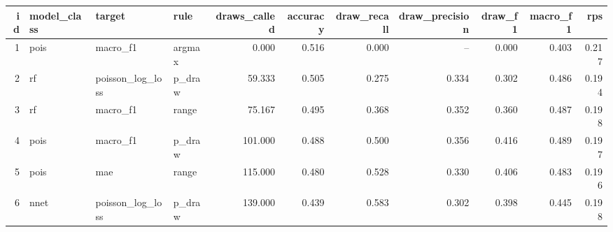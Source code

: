 
\begin{tabular}{rlllrrrrrrr}
\toprule
id & model\_class & target & rule & draws\_called & accuracy & draw\_recall & draw\_precision & draw\_f1 & macro\_f1 & rps\\
\midrule
1 & pois & macro\_f1 & argmax & 0.000 & 0.516 & 0.000 & -- & 0.000 & 0.403 & 0.217\\
2 & rf & poisson\_log\_loss & p\_draw & 59.333 & 0.505 & 0.275 & 0.334 & 0.302 & 0.486 & 0.194\\
3 & rf & macro\_f1 & range & 75.167 & 0.495 & 0.368 & 0.352 & 0.360 & 0.487 & 0.198\\
4 & pois & macro\_f1 & p\_draw & 101.000 & 0.488 & 0.500 & 0.356 & 0.416 & 0.489 & 0.197\\
5 & pois & mae & range & 115.000 & 0.480 & 0.528 & 0.330 & 0.406 & 0.483 & 0.196\\
6 & nnet & poisson\_log\_loss & p\_draw & 139.000 & 0.439 & 0.583 & 0.302 & 0.398 & 0.445 & 0.198\\
\bottomrule
\end{tabular}
